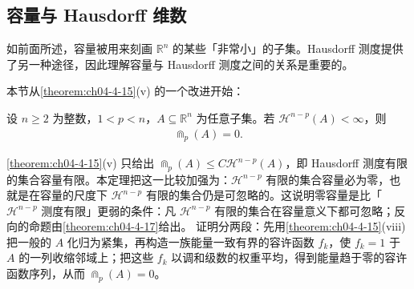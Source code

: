 \documentclass[../../main.tex]{subfiles}%
\begin{document}
\subsection{容量与 Hausdorff 维数}\label{subsection:ch04-07-2}

如前面所述，容量被用来刻画 $\mathbb{R}^n$ 的某些「非常小」的子集。Hausdorff 测度提供了另一种途径，因此理解容量与 Hausdorff 测度之间的关系是重要的。

本节从\cref{theorem:ch04-4-15}(v) 的一个改进开始：%

\begin{theorem}\label{theorem:ch04-4-16}
设 $n\geqslant2$ 为整数，$1<p<n$，$A\subseteq\mathbb{R}^n$ 为任意子集。若 $\mathcal{H}^{n-p}(A)<\infty$，则
\begin{align*}
\Cap_p(A)=0 .
\end{align*}
\end{theorem}

\begin{remark}\label{remark:ch04-thm-4-16-动机}
\cref{theorem:ch04-4-15}(v) 只给出 $\Cap_p(A)\leqslant C\mathcal{H}^{n-p}(A)$，即 Hausdorff 测度有限的集合容量有限。本定理把这一比较加强为：$\mathcal{H}^{n-p}$ 有限的集合容量必为零，也就是在容量的尺度下 $\mathcal{H}^{n-p}$ 有限的集合仍是可忽略的。这说明零容量是比「$\mathcal{H}^{n-p}$ 测度有限」更弱的条件：凡 $\mathcal{H}^{n-p}$ 有限的集合在容量意义下都可忽略；反向的命题由\cref{theorem:ch04-4-17}给出。%
证明分两段：先用\cref{theorem:ch04-4-15}(viii) 把一般的 $A$ 化归为紧集，再构造一族能量一致有界的容许函数 $f_k$，使 $f_k=1$ 于 $A$ 的一列收缩邻域上；把这些 $f_k$ 以调和级数的权重平均，得到能量趋于零的容许函数序列，从而 $\Cap_p(A)=0$。%
\end{remark}
\end{document}
